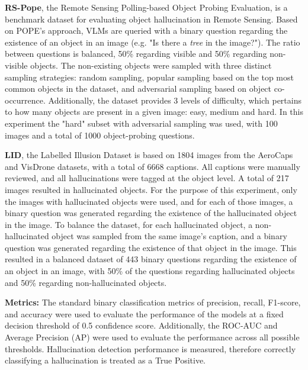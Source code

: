 \begin{description}
	\item \textbf{RS-Pope}, the Remote Sensing Polling-based Object Probing Evaluation, is a benchmark dataset for evaluating object hallucination in Remote Sensing. Based on POPE's approach, VLMs are queried with a binary question regarding the existence of an object in an image (e.g. "Is there a \textit{tree} in the image?"). The ratio between questions is balanced, 50\% regarding visible and 50\% regarding non-visible objects.
	      The non-existing objects were sampled with three distinct sampling strategies: random sampling, popular sampling based on the top most common objects in the dataset, and adversarial sampling based on object co-occurrence. Additionally, the dataset provides 3 levels of difficulty, which pertains to how many objects are present in a given image: easy, medium and hard. In this experiment the "hard" subset with adversarial sampling was used, with 100 images and a total of 1000 object-probing questions.

	\item \textbf{LID}, the Labelled Illusion Dataset is based on 1804 images from the AeroCaps and VisDrone datasets, with a total of 6668 captions. All captions were manually reviewed, and all hallucinations were tagged at the object level. A total of 217 images resulted in hallucinated objects. For the purpose of this experiment, only the images with hallucinated objects were used, and for each of those images, a binary question was generated regarding the existence of the hallucinated object in the image. To balance the dataset, for each hallucinated object, a non-hallucinated object was sampled from the same image's caption, and a binary question was generated regarding the existence of that object in the image. This resulted in a balanced dataset of 443 binary questions regarding the existence of an object in an image, with 50\% of the questions regarding hallucinated objects and 50\% regarding non-hallucinated objects.

	\item \textbf{Metrics:} The standard binary classification metrics of precision, recall, F1-score, and accuracy were used to evaluate the performance of the models at a fixed decision threshold of 0.5 confidence score. Additionally, the ROC-AUC and Average Precision (AP) were used to evaluate the performance across all possible thresholds. Hallucination detection performance is measured, therefore correctly classifying a hallucination is treated as a True Positive.
\end{description}

